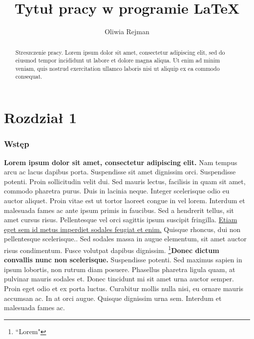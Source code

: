 \documentclass[12pt,a4paper]{article}
\title{Tytuł pracy w programie \LaTeX}
\author{Oliwia Rejman}
\begin{document}
	\maketitle
	
	\begin{abstract}
		Streszczenie pracy. Lorem ipsum dolor sit amet, consectetur adipiscing elit, sed do eiusmod tempor incididunt ut labore et dolore magna aliqua. Ut enim ad minim veniam, quis nostrud exercitation ullamco laboris nisi ut aliquip ex ea commodo consequat.
	\end{abstract}
	
	\newpage
	
	\tableofcontents
	
	\newpage
	
	\part {Rozdział 1}
	\section{Wstęp}
	\textbf{Lorem ipsum dolor sit amet, consectetur adipiscing elit.} Nam tempus arcu ac lacus dapibus porta. Suspendisse sit amet dignissim orci. Suspendisse potenti. Proin sollicitudin velit dui. Sed mauris lectus, facilisis in quam sit amet, commodo pharetra purus. Duis in lacinia neque. Integer scelerisque odio eu auctor aliquet. Proin vitae est ut tortor laoreet congue in vel lorem. Interdum et malesuada fames ac ante ipsum primis in faucibus. Sed a hendrerit tellus, sit amet cursus risus. Pellentesque vel orci sagittis ipsum suscipit fringilla. \underline{Etiam eget sem id metus imperdiet sodales feugiat et enim.} Quisque rhoncus, dui non pellentesque scelerisque.. Sed sodales massa in augue elementum, sit amet auctor risus condimentum. Fusce volutpat dapibus dignissim. \footnote{``Lorem"}\textbf{Donec dictum convallis nunc non scelerisque.} Suspendisse potenti. Sed maximus sapien in ipsum lobortis, non rutrum diam posuere. Phasellus pharetra ligula quam, at pulvinar mauris sodales et. Donec tincidunt mi sit amet urna auctor semper. Proin eget odio et ex porta luctus. Curabitur mollis nulla nisi, eu ornare mauris accumsan ac. In at orci augue. Quisque dignissim urna sem. Interdum et malesuada fames ac.
\end{document}

